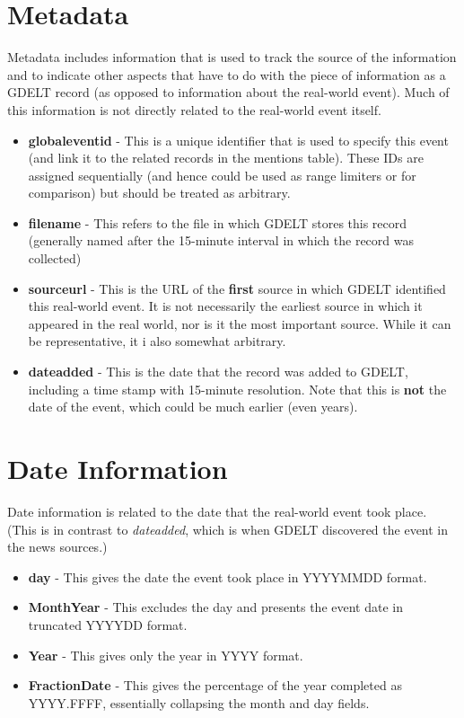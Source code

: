 \section{Metadata}
\par Metadata includes information that is used to track the source of the information and to indicate other aspects that have to do with the piece of information as a GDELT record (as opposed to information about the real-world event). Much of this information is not directly related to the real-world event itself.
    \begin{itemize} 
        \item \textbf{globaleventid} - This is a unique identifier that is used to specify this event (and link it to the related records in the mentions table). These IDs are assigned sequentially (and hence could be used as range limiters or for comparison) but should be treated as arbitrary.
        \item \textbf{filename} - This refers to the file in which GDELT stores this record (generally named after the 15-minute interval in which the record was collected) %
        \item \textbf{sourceurl} - This is the URL of the \textbf{first} source in which GDELT identified this real-world event. It is not necessarily the earliest source in which it appeared in the real world, nor is it the most important source. While it can be representative, it i also somewhat arbitrary.
        \item \textbf{dateadded} - This is the date that the record was added to GDELT, including a time stamp with 15-minute resolution. Note that this is \textbf{not} the date of the event, which could be much earlier (even years).
   \end{itemize}
   
   
\section{Date Information}

Date information is related to the date that the real-world event took place. (This is in contrast to \textit{dateadded}, which is when GDELT discovered the event in the news sources.)
        \begin{itemize} 
            \item \textbf{day} - This gives the date the event took place in YYYYMMDD format. 
            \item \textbf{MonthYear} - This excludes the day and presents the event date in truncated YYYYDD format.
            \item \textbf{Year} - This gives only the year in YYYY format.
            \item \textbf{FractionDate} - This gives the percentage of the year completed as YYYY.FFFF, essentially collapsing the month and day fields.
       \end{itemize}
        
